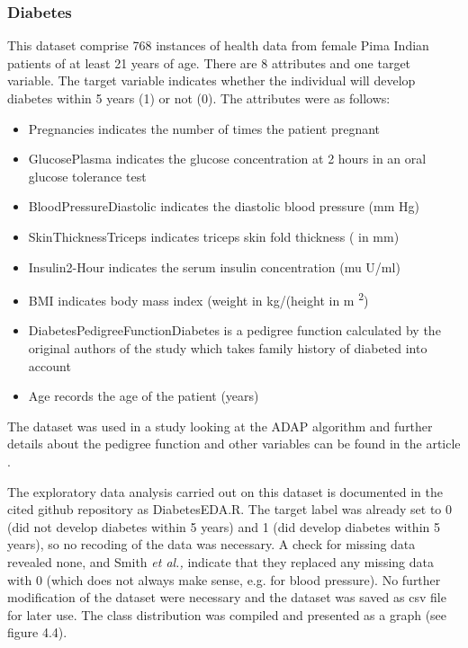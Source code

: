 \subsubsection{Diabetes}
This dataset comprise 768 instances of health data from female Pima Indian patients of at least 21 years of age. There are 8 attributes and one target variable. The target variable indicates whether the individual will develop diabetes within 5 years (1) or not (0). The attributes were as follows:
\begin{itemize}
    \item Pregnancies indicates the number of times the patient pregnant
    \item GlucosePlasma indicates the glucose concentration at 2 hours in an oral glucose tolerance test
    \item BloodPressureDiastolic indicates the diastolic blood pressure (mm Hg)
    \item SkinThicknessTriceps indicates triceps skin fold thickness ( in mm)
    \item Insulin2-Hour indicates the serum insulin concentration  (mu U/ml)
    \item BMI indicates body mass index (weight in kg/(height in m \textsuperscript{2})
    \item DiabetesPedigreeFunctionDiabetes is a pedigree function calculated by the original authors of the study which takes family history of diabeted into account
    \item Age records the age of the patient (years)
\end{itemize}
 The dataset was used in a study looking at the ADAP algorithm and further details about the pedigree function and other variables can be found in the article \cite{Smith:1988wy}.
 
The exploratory data analysis carried out on this dataset is documented in the cited github repository as DiabetesEDA.R.\newline
The target label was already set to 0 (did not develop diabetes within 5 years) and 1 (did develop diabetes within 5 years), so no recoding of the data was necessary.\newline
A check for missing data revealed none, and Smith \textit{et al.,} indicate that they replaced any missing data with 0 (which does not always make sense, e.g. for blood pressure). No further modification of the dataset were necessary and the dataset was saved as csv file for later use.
The class distribution was compiled and presented as a graph (see figure 4.4).

